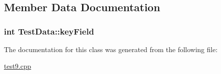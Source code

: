 \subsection{Member Data Documentation}
\hypertarget{class_test_data_adafb60a315eaa088791c9e40f4a2618f}{
\subsubsection[{key\+Field}]{\setlength{\rightskip}{0pt plus 5cm}int Test\+Data\+::key\+Field\hspace{0.3cm}{\ttfamily [private]}}}\label{class_test_data_adafb60a315eaa088791c9e40f4a2618f}


The documentation for this class was generated from the following file\+:\begin{DoxyCompactItemize}
\item 
\hyperlink{test9_8cpp}{test9.\+cpp}\end{DoxyCompactItemize}
